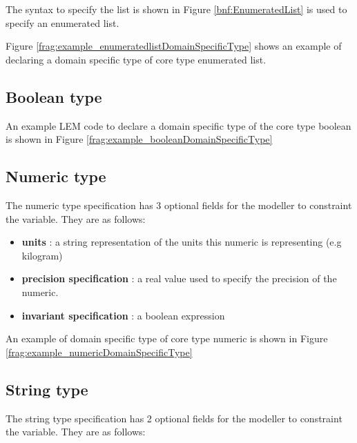 The syntax to specify the list is shown in Figure \ref{bnf:EnumeratedList} is used to specify an enumerated list.


Figure \ref{frag:example_enumeratedlistDomainSpecificType} shows an example of declaring a domain specific type of core type enumerated list.


\subsection{Boolean type}
An example LEM code to declare a domain specific type of the core type boolean is shown in Figure \ref{frag:example_booleanDomainSpecificType}


\subsection{Numeric type}
The numeric type specification has 3 optional fields for the modeller to constraint the variable. They are as follows:

\begin{itemize}
\item \textbf{units} : a string representation of the units this numeric is representing (e.g kilogram)

\item \textbf{precision specification} : a real value used to specify
  the precision of the numeric.

\item \textbf{invariant specification} : a boolean expression 
\end{itemize}

An example of domain specific type of core type numeric is shown in Figure \ref{frag:example_numericDomainSpecificType}


\subsection{String type}
The string type specification has 2 optional fields for the modeller to constraint the variable. They are as follows:

